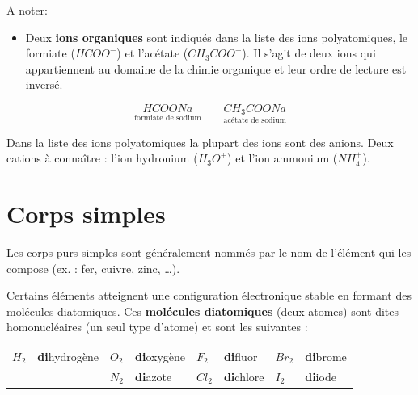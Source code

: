 \documentclass[
  11pt,
  a4paper,
  openany]{book}
\providecommand{\tightlist}{%
  \setlength{\itemsep}{0pt}\setlength{\parskip}{0pt}}
\begin{document}
A noter:

\begin{itemize}
\tightlist
\item
  Deux \textbf{ions organiques} sont indiqués dans la liste des ions polyatomiques, le formiate (\(HCOO^-\)) et l'acétate (\(CH_3COO^-\)). Il s'agit de deux ions qui appartiennent au domaine de la chimie organique et leur ordre de lecture est inversé.
\end{itemize}

\[ \underset{\text{formiate de sodium}}{HCOONa} \qquad \underset{\text{acétate de sodium}}{CH_3COONa} \]

Dans la liste des ions polyatomiques la plupart des ions sont des anions. Deux cations à connaître : l'ion hydronium (\(H_3O^+\)) et l'ion ammonium (\(NH_4^+\)).

\section{Corps simples}\label{corps-simples}

Les corps purs simples sont généralement nommés par le nom de l'élément qui les compose (ex. : fer, cuivre, zinc, \ldots).

Certains éléments atteignent une configuration électronique stable en formant des molécules diatomiques. Ces \textbf{molécules diatomiques} (deux atomes) sont dites homonucléaires (un seul type d'atome) et sont les suivantes :

\begin{longtable}[]{@{}
  >{\centering\arraybackslash}p{}
  >{\raggedright\arraybackslash}p{}
  >{\centering\arraybackslash}p{}
  >{\raggedright\arraybackslash}p{}
  >{\centering\arraybackslash}p{}
  >{\raggedright\arraybackslash}p{}
  >{\centering\arraybackslash}p{}
  >{\raggedright\arraybackslash}p{}@{}}
\toprule\noalign{}
\endhead
\bottomrule\noalign{}
\endlastfoot
\(H_2\) & \textbf{di}hydrogène & \(O_2\) & \textbf{di}oxygène & \(F_2\) & \textbf{di}fluor & \(Br_2\) & \textbf{di}brome \\
& & \(N_2\) & \textbf{di}azote & \(Cl_2\) & \textbf{di}chlore & \(I_2\) & \textbf{di}iode \\
\end{longtable}
\end{document}

